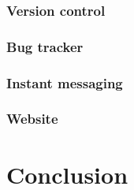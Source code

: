 \documentclass{report} %
\begin{document}
\subsubsection{Version control}
\subsubsection{Bug tracker}
\subsubsection{Instant messaging}
\subsubsection{Website}

\section{Conclusion}


\end{document}
